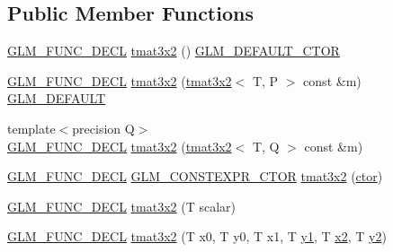 \subsection*{Public Member Functions}
\begin{DoxyCompactItemize}
\item 
\mbox{\hyperlink{setup_8hpp_ab2d052de21a70539923e9bcbf6e83a51}{G\+L\+M\+\_\+\+F\+U\+N\+C\+\_\+\+D\+E\+CL}} \mbox{\hyperlink{structglm_1_1tmat3x2_af6769c468c605112c3bf8db506d3fa73}{tmat3x2}} () \mbox{\hyperlink{setup_8hpp_afb97a4e995bc004c0cbbfa22125b80ba}{G\+L\+M\+\_\+\+D\+E\+F\+A\+U\+L\+T\+\_\+\+C\+T\+OR}}
\item 
\mbox{\hyperlink{setup_8hpp_ab2d052de21a70539923e9bcbf6e83a51}{G\+L\+M\+\_\+\+F\+U\+N\+C\+\_\+\+D\+E\+CL}} \mbox{\hyperlink{structglm_1_1tmat3x2_a654f76d38f00d3c005a9bddb23200c2e}{tmat3x2}} (\mbox{\hyperlink{structglm_1_1tmat3x2}{tmat3x2}}$<$ T, P $>$ const \&m) \mbox{\hyperlink{setup_8hpp_aefce7051c376a64ba89fa93a9f63bc2c}{G\+L\+M\+\_\+\+D\+E\+F\+A\+U\+LT}}
\item 
{\footnotesize template$<$precision Q$>$ }\\\mbox{\hyperlink{setup_8hpp_ab2d052de21a70539923e9bcbf6e83a51}{G\+L\+M\+\_\+\+F\+U\+N\+C\+\_\+\+D\+E\+CL}} \mbox{\hyperlink{structglm_1_1tmat3x2_a238eaf8178ff26a8c6adb554790043ee}{tmat3x2}} (\mbox{\hyperlink{structglm_1_1tmat3x2}{tmat3x2}}$<$ T, Q $>$ const \&m)
\item 
\mbox{\hyperlink{setup_8hpp_ab2d052de21a70539923e9bcbf6e83a51}{G\+L\+M\+\_\+\+F\+U\+N\+C\+\_\+\+D\+E\+CL}} \mbox{\hyperlink{setup_8hpp_ad34178a09666081abdb573c14d1f4a5a}{G\+L\+M\+\_\+\+C\+O\+N\+S\+T\+E\+X\+P\+R\+\_\+\+C\+T\+OR}} \mbox{\hyperlink{structglm_1_1tmat3x2_a55c97bff59125b697080912cfa030b0e}{tmat3x2}} (\mbox{\hyperlink{namespaceglm_a807df837905ec286f806a536af03b57f}{ctor}})
\item 
\mbox{\hyperlink{setup_8hpp_ab2d052de21a70539923e9bcbf6e83a51}{G\+L\+M\+\_\+\+F\+U\+N\+C\+\_\+\+D\+E\+CL}} \mbox{\hyperlink{structglm_1_1tmat3x2_a874b837bb746cd36e0e98d7d692a29f2}{tmat3x2}} (T scalar)
\item 
\mbox{\hyperlink{setup_8hpp_ab2d052de21a70539923e9bcbf6e83a51}{G\+L\+M\+\_\+\+F\+U\+N\+C\+\_\+\+D\+E\+CL}} \mbox{\hyperlink{structglm_1_1tmat3x2_a7fecf49cbc87b5fc10c41f17fc66f43f}{tmat3x2}} (T x0, T y0, T x1, T \mbox{\hyperlink{glad_8h_a48340161068d267815ac3131e9d03def}{y1}}, T \mbox{\hyperlink{glad_8h_ad2cea6eadb01f017f0d57e7edf0ce988}{x2}}, T \mbox{\hyperlink{glad_8h_af7158b5d27f7a6aa4ab9973fcc3a5c20}{y2}})
\item 

\end{DoxyCompactItemize}
